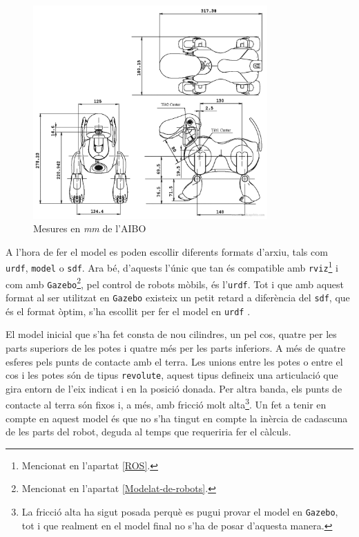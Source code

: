 \documentclass[12pt,a4paper,final,twoside]{report}
\begin{document}
\begin{figure}[tb]
\centering
\includegraphics[width=0.8\textwidth]{Imatges/aibo-4.pdf}
\caption{Mesures en \textit{mm} de l'AIBO \cite{Blueprint}}
\label{fig:mesures-aibo-model}
\end{figure}

A l'hora de fer el model es poden escollir diferents formats d'arxiu, tals com \texttt{urdf}, \texttt{model} o \texttt{sdf}. Ara bé, d'aquests l'únic que tan és compatible amb \texttt{rviz}\footnote{Mencionat en l'apartat \ref{ROS}.} i com amb \texttt{Gazebo}\footnote{Mencionat en l'apartat \ref{Modelat-de-robots}.}, pel control de robots mòbils, és l'\texttt{urdf}. Tot i que amb aquest format al ser utilitzat en \texttt{Gazebo} existeix un petit retard a diferència del \texttt{sdf}, que és el format òptim, s'ha escollit per fer el model en \texttt{urdf} \cite{Sucan}.

El model inicial que s'ha fet consta de nou cilindres, un pel cos, quatre per les parts superiors de les potes i quatre més per les parts inferiors. A més de quatre esferes pels punts de contacte amb el terra. Les unions entre les potes o entre el cos i les potes són de tipus \texttt{revolute}, aquest tipus defineix una articulació que gira entorn de l'eix indicat i en la posició donada. Per altra banda, els punts de contacte al terra són fixos i, a més, amb fricció molt alta\footnote{La fricció alta ha sigut posada perquè es pugui provar el model en \texttt{Gazebo}, tot i que realment en el model final no s'ha de posar d'aquesta manera.}. Un fet a tenir en compte en aquest model és que no s'ha tingut en compte la inèrcia de cadascuna de les parts del robot, deguda al temps que requeriria fer el càlculs. 
\end{document}

